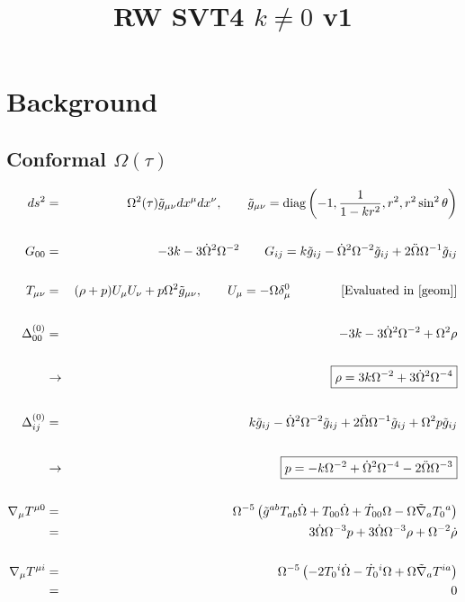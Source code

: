 \documentclass[10pt,letterpaper]{article}
\title{RW SVT4 $k\ne 0$ v1}
\date{}
\numberwithin{equation}{section}
\begin{document}
 
\maketitle
\noindent 
\section{Background}

\subsection{Conformal $\Omega(\tau)$}
\begin{eqnarray}
ds^2 &=& \Omega^2(\tau)\tilde g_{\mu\nu} dx^\mu dx^\nu,\qquad 
\tilde g_{\mu\nu} = \text{diag}\left(-1,\frac{1}{1-kr^2},r^2,r^2\sin^2\theta\right)
\label{geom}
\\ \nonumber\\
G_{00}&=& -3k - 3 \dot\Omega^2\Omega^{-2}
\qquad
G_{ij} = k\tilde g_{ij} - \dot\Omega^2\Omega^{-2}\tilde g_{ij} + 2\ddot\Omega \Omega^{-1} \tilde g_{ij}
\\ \nonumber\\
T_{\mu\nu} &=& (\rho+p)U_\mu U_\nu + p\Omega^2 \tilde g_{\mu\nu},\qquad U_\mu = - \Omega \delta^0_\mu  \qquad\qquad  \text{[Evaluated in \eqref{geom}]}
\\ \nonumber\\
\Delta^{(0)}_{00} &=& -3k - 3 \dot\Omega^2\Omega^{-2} + \Omega^2 \rho
\\ \nonumber\\
&\to&\boxed{\rho = 3k\Omega^{-2}+3\dot\Omega^2 \Omega^{-4}}
\label{rho}
\\ \nonumber\\
\Delta^{(0)}_{ij} &=& k\tilde g_{ij} - \dot\Omega^2\Omega^{-2}\tilde g_{ij} + 2\ddot\Omega \Omega^{-1} \tilde g_{ij} + \Omega^2 p
\tilde g_{ij}
\\ \nonumber\\
&\to& \boxed{p = -k\Omega^{-2} + \dot\Omega^2\Omega^{-4} -2\ddot\Omega \Omega^{-3}}
\label{p}
\\ \nonumber\\
\nabla_\mu T^{\mu 0} &=& \Omega^{-5}\left( \tilde g^{ab} T_{ab} \dot{\Omega} + T_{00}{} \dot{\Omega} + \dot{T}_{00}{} \Omega -  \Omega \tilde{\nabla}_{a}T_{0}{}^{a}\right) 
\nonumber\\
&=& 3 \dot{\Omega}  \Omega^{-3}p + 3 \dot{\Omega}  \Omega^{-3}\rho +  \Omega^{-2}\dot{\rho}
\label{Tcons0}
\\ \nonumber\\
\nabla_\mu T^{\mu i} &=& \Omega^{-5}\left(-2 T_{0}{}^{i} \dot{\Omega} -  \dot{T}_{0}{}^{i} \Omega + \Omega \tilde{\nabla}_{a}T^{ia}\right)
\nonumber\\
&=&0
\end{eqnarray}
%
%
\end{document}
